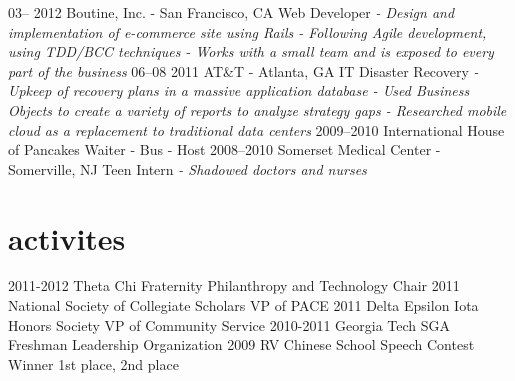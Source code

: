 \documentclass[]{cv}
\begin{document}
\begin{entrylist}
  \entry
    {03– 2012}
    {Boutine, Inc. - San Francisco, CA}
    {Web Developer}
    {\emph{- Design and implementation of e-commerce site using Rails
    \newline - Following Agile development, using TDD/BCC techniques
    \newline - Works with a small team and is exposed to every part of the business\newline}}
  \entry
    {06–08 2011}
    {AT\&T - Atlanta, GA}
    {IT Disaster Recovery}
    {\emph{- Upkeep of recovery plans in a massive application database
    \newline - Used Business Objects to create a variety of reports to analyze strategy gaps
    \newline - Researched mobile cloud as a replacement to traditional data centers\newline}}
  \entry
    {2009–2010}
    {International House of Pancakes}
    {Waiter - Bus - Host}
    {}
  \entry
    {2008–2010}
    {Somerset Medical Center - Somerville, NJ}
    {Teen Intern}
    {\emph{- Shadowed doctors and nurses\newline}}
\end{entrylist}

\section{activites}

\begin{entrylist}
  \entry
    {2011-2012}
    {Theta Chi Fraternity}
    {Philanthropy and Technology Chair}
    {}
  \entry
    {2011}
    {National Society of Collegiate Scholars}
    {VP of PACE}
    {}
  \entry
    {2011}
    {Delta Epsilon Iota Honors Society}
    {VP of Community Service}
    {}
  \entry
    {2010-2011}
    {Georgia Tech SGA}
    {Freshman Leadership Organization}
    {}
  \entry
    {2009}
    {RV Chinese School Speech Contest Winner}
    {1st place, 2nd place}
    {}
\end{entrylist}
\end{document}
